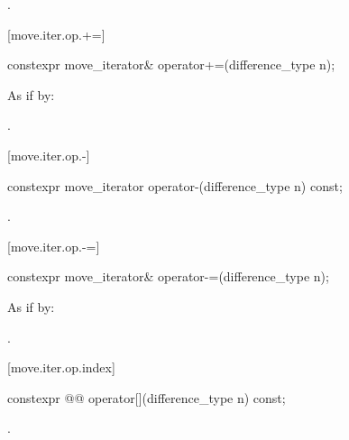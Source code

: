 \begin{itemdescr}
\pnum
\returns {}.
\end{itemdescr}

[move.iter.op.+=]{}

%
\begin{itemdecl}
constexpr move_iterator& operator+=(difference_type n);
\end{itemdecl}

\begin{itemdescr}
\pnum
\effects As if by: 

\pnum
\returns {}.
\end{itemdescr}

[move.iter.op.-]{}

%
\begin{itemdecl}
constexpr move_iterator operator-(difference_type n) const;
\end{itemdecl}

\begin{itemdescr}
\pnum
\returns {}.
\end{itemdescr}

[move.iter.op.-=]{}

%
\begin{itemdecl}
constexpr move_iterator& operator-=(difference_type n);
\end{itemdecl}

\begin{itemdescr}
\pnum
\effects As if by: 

\pnum
\returns {}.
\end{itemdescr}

[move.iter.op.index]{}

%
\begin{itemdecl}
constexpr @@ operator[](difference_type n) const;
\end{itemdecl}

\begin{itemdescr}
\pnum
\returns {}.
\end{itemdescr}

